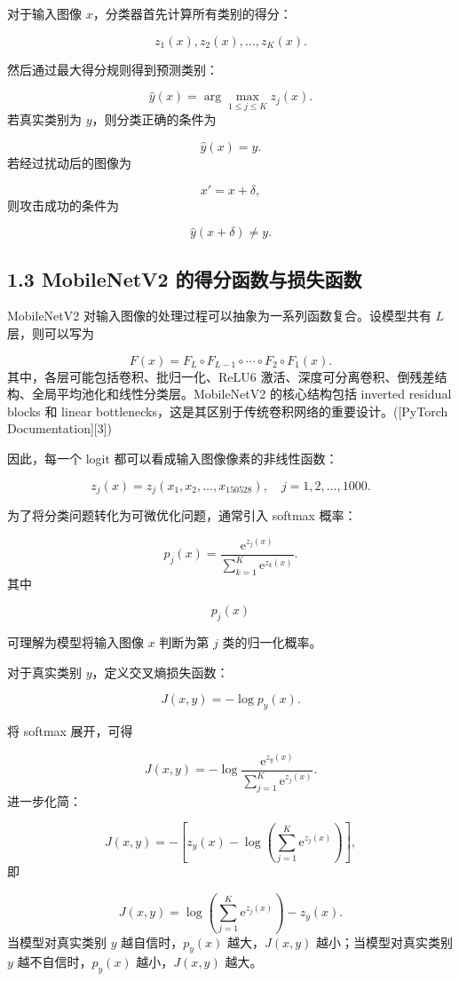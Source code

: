 ﻿\documentclass[UTF8,zihao=-4,fontset=none]{ctexart}
\begin{document}
对于输入图像 \(x\)，分类器首先计算所有类别的得分：

\[
z_1(x),z_2(x),\ldots,z_K(x).
\]

然后通过最大得分规则得到预测类别：

\[
\hat y(x)=\arg\max_{1\le j\le K}z_j(x).
\]
\noindent 若真实类别为 \(y\)，则分类正确的条件为

\[
\hat y(x)=y.
\]
\noindent 若经过扰动后的图像为

\[
x'=x+\delta,
\]
\noindent 则攻击成功的条件为

\[
\hat y(x+\delta)\ne y.
\]

\subsection*{1.3 MobileNetV2 的得分函数与损失函数}
{}

MobileNetV2 对输入图像的处理过程可以抽象为一系列函数复合。设模型共有 \(L\) 层，则可以写为

\[
F(x)=F_L\circ F_{L-1}\circ \cdots \circ F_2\circ F_1(x).
\]
\noindent 其中，各层可能包括卷积、批归一化、ReLU6 激活、深度可分离卷积、倒残差结构、全局平均池化和线性分类层。MobileNetV2 的核心结构包括 inverted residual blocks 和 linear bottlenecks，这是其区别于传统卷积网络的重要设计。([PyTorch Documentation][3])

因此，每一个 logit 都可以看成输入图像像素的非线性函数：

\[
z_j(x)=z_j(x_1,x_2,\ldots,x_{150528}),
\quad j=1,2,\ldots,1000.
\]

为了将分类问题转化为可微优化问题，通常引入 softmax 概率：

\[
p_j(x)
=
\frac{\mathrm{e}^{z_j(x)}}{\sum_{k=1}^{K}\mathrm{e}^{z_k(x)}}.
\]
\noindent 其中

\[
p_j(x)
\]

可理解为模型将输入图像 \(x\) 判断为第 \(j\) 类的归一化概率。

对于真实类别 \(y\)，定义交叉熵损失函数：

\[
J(x,y)
=
-\log p_y(x).
\]

将 softmax 展开，可得

\[
J(x,y)
=
-\log
\frac{\mathrm{e}^{z_y(x)}}{\sum_{j=1}^{K}\mathrm{e}^{z_j(x)}}.
\]
\noindent 进一步化简：

\[
J(x,y)
=
-\left[
z_y(x)-\log\left(\sum_{j=1}^{K}\mathrm{e}^{z_j(x)}\right)
\right],
\]
\noindent 即

\[
J(x,y)
=
\log\left(\sum_{j=1}^{K}\mathrm{e}^{z_j(x)}\right)
-
z_y(x).
\]
\noindent 当模型对真实类别 \(y\) 越自信时，\(p_y(x)\) 越大，\(J(x,y)\) 越小；当模型对真实类别 \(y\) 越不自信时，\(p_y(x)\) 越小，\(J(x,y)\) 越大。
\end{document}
